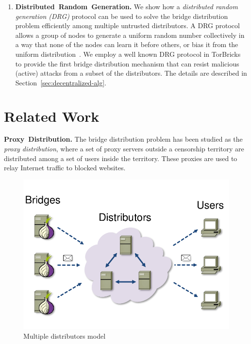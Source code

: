 \documentclass[a4paper,UKenglish]{lipics-v2016}
\newcommand{\bricks}{}
\def\bricks/{\mbox{TorBricks}}
\newcommand{\sfsize}{\fontsize{0.68\baselineskip}{0.68\baselineskip}\selectfont}
\newcommand{\sans}[1]{\textbf{\textsf{\sfsize \mbox{#1}}}}
\newcommand{\para}[1]{\vspace{0.55em} \noindent \sans{{\mbox{#1}}}}
\begin{document}
\begin{enumerate}[leftmargin=1.7em, itemsep=0.7em, topsep=0.6em]
	
	\item \sans{Distributed Random Generation.} We show how a \emph{distributed random generation (DRG)} protocol can be used to solve the bridge distribution problem efficiently among multiple untrusted distributors. A DRG protocol allows a group of nodes to generate a uniform random number collectively in a way that none of the nodes can learn it before others, or bias it from the uniform distribution~\cite{cryptoeprint:2015:366,Tor:DRG:Proposal:2015}. We employ a well known DRG protocol in \bricks/ to provide the first bridge distribution mechanism that can resist malicious (active) attacks from a subset of the distributors. The details are described in Section~\ref{sec:decentralized-alg}.
\end{enumerate}

\section{Related Work} \label{sec:relatedwork}
\para{Proxy Distribution.} The bridge distribution problem has been studied as the \emph{proxy distribution}, where a set of proxy servers outside a censorship territory are distributed among a set of users inside the territory. These proxies are used to relay Internet traffic to blocked websites. 

\begin{figure}[t]
	\centering
	\includegraphics[width=0.4\linewidth]{images/multi-alg}
	\caption{Multiple distributors model}
	\label{fig:multidist}
\end{figure}
\end{document}
